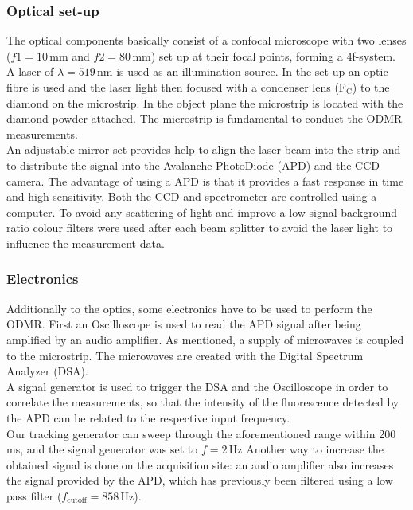  \subsubsection{Optical set-up}
 
The optical components basically consist of a confocal microscope with two lenses ($f1=10\,\mathrm{mm}$ and $f2=80\,\mathrm{mm}$) set up at their focal points, forming a 4f-system. A laser of $\lambda=519\,\mathrm{nm}$ is used as an illumination source. In the set up an optic fibre is used and the laser light then focused with a condenser lens (F$_\mathrm{C}$) to the diamond on the microstrip.
In the object plane the microstrip is located with the diamond powder attached. The microstrip is fundamental to conduct the ODMR measurements.\\

An adjustable mirror set provides help to align the laser beam into the strip and to distribute the signal into the Avalanche PhotoDiode (APD) and the CCD camera. The advantage of using a APD is that it provides a fast response in time and high sensitivity. Both the CCD and spectrometer are controlled using a computer. To avoid any scattering of light and improve a low signal-background ratio colour filters were used after each beam splitter to avoid the laser light to influence the measurement data.

\subsubsection{Electronics}

Additionally to the optics, some electronics have to be used to perform the ODMR. First an Oscilloscope is used to read the APD signal after being amplified by an audio amplifier. As mentioned, a supply of microwaves is coupled to the microstrip. The microwaves are created with the Digital Spectrum Analyzer (DSA).\\

A signal generator is used to trigger the DSA and the Oscilloscope in order to correlate the measurements, so that the intensity of the fluorescence detected by the APD can be related to the respective input frequency.\\
 
Our tracking generator can sweep through the aforementioned range within 200 ms, and  the signal generator was set to $f=2\,\mathrm{Hz}$  Another way to increase the obtained signal is done on the acquisition site: an audio amplifier also increases the signal provided by the APD, which has previously been filtered using a low pass filter ($f_\mathrm{cutoff}=858\,\mathrm{Hz}$). \\
 
